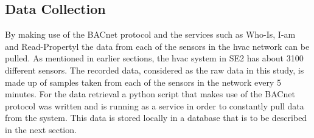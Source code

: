 \subsection{Data Collection}

By making use of the BACnet protocol and the services such as Who-Is, I-am and Read-Propertyl the data from each of the sensors in the \gls{hvac} network can be pulled. As mentioned in earlier sections, the \gls{hvac} system in SE2 has about 3100 different sensors. The recorded data, considered as the raw data in this study, is made up of samples taken from each of the sensors in the network every 5 minutes. For the data retrieval a python script that makes use of the BACnet protocol was written and is running as a service in order to constantly pull data from the system. This data is stored locally in a database that is to be described in the next section.